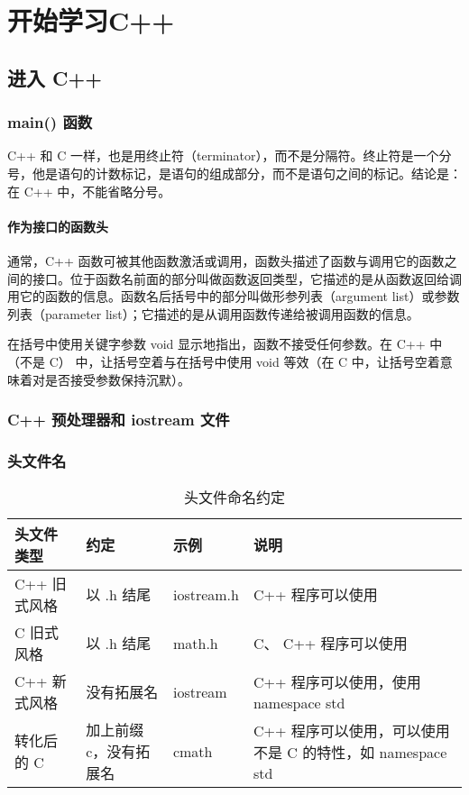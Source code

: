 \chapter{开始学习C++\label{ch01}}
\section{进入 C++}
\subsection{main() 函数}
C++ 和 C 一样，也是用终止符（terminator），而不是分隔符。终止符是一个分号，他是语句的计数标记，是语句的组成部分，而不是语句之间的标记。结论是：在 C++ 中，不能省略分号。
\subsubsection{作为接口的函数头}
通常，C++ 函数可被其他函数激活或调用，函数头描述了函数与调用它的函数之间的接口。位于函数名前面的部分叫做函数返回类型，它描述的是从函数返回给调用它的函数的信息。函数名后括号中的部分叫做形参列表（argument list）或参数列表（parameter list）；它描述的是从调用函数传递给被调用函数的信息。

在括号中使用关键字参数 void 显示地指出，函数不接受任何参数。在 C++ 中（不是 C） 中，让括号空着与在括号中使用 void 等效（在 C 中，让括号空着意味着对是否接受参数保持沉默）。
\subsection{C++ 预处理器和 iostream 文件}
\subsection{头文件名}
\begin{table}
    \centering
    \caption{头文件命名约定}
    \label{tbl2-1}
    \begin{tabularx}{\textwidth}{lllX}
        \hline
        头文件类型    & 约定           & 示例         & 说明                                      \\
        \hline
        C++ 旧式风格 & 以 .h 结尾      & iostream.h & C++ 程序可以使用                              \\
        C 旧式风格   & 以 .h 结尾      & math.h     & C、 C++ 程序可以使用                           \\
        C++ 新式风格 & 没有拓展名        & iostream   & C++ 程序可以使用，使用 namespace std             \\
        转化后的 C   & 加上前缀 c，没有拓展名 & cmath      & C++ 程序可以使用，可以使用不是 C 的特性，如 namespace std \\
        \hline
    \end{tabularx}
\end{table}
